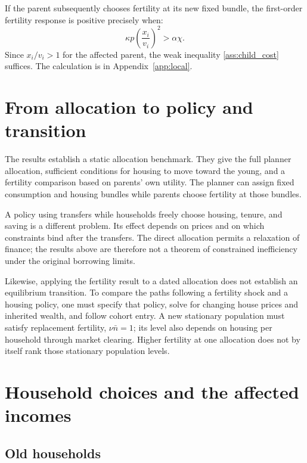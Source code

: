\documentclass[11pt]{article}
\begin{document}
If the parent subsequently chooses fertility at its new fixed bundle, the
first-order fertility response is positive precisely when:
\begin{equation}
\kappa p\left(\frac{x_i}{v_i}\right)^2>\alpha\chi.
\label{eq:local_fertility}
\end{equation}
Since $x_i/v_i>1$ for the affected parent, the weak inequality
\eqref{ass:child_cost} suffices. The calculation is in
Appendix~\ref{app:local}.

\section{From allocation to policy and transition}

The results establish a static allocation benchmark. They give the full
planner allocation, sufficient conditions for housing to move toward the
young, and a fertility comparison based on parents' own utility. The planner
can assign fixed consumption and housing bundles while parents choose fertility
at those bundles.

A policy using transfers while households freely choose housing, tenure, and
saving is a different problem. Its effect depends on prices and on which
constraints bind after the transfers. The direct allocation permits a
relaxation of finance; the results above are therefore not a theorem of
constrained inefficiency under the original borrowing limits.

Likewise, applying the fertility result to a dated allocation does not establish
an equilibrium transition. To compare the paths following a fertility shock
and a housing policy, one must specify that policy, solve for changing house
prices and inherited wealth, and follow cohort entry. A new stationary
population must satisfy replacement fertility, $\nu\bar n=1$; its level also
depends on housing per household through market clearing. Higher fertility at
one allocation does not by itself rank those stationary population levels.

\clearpage
\appendix
\section{Household choices and the affected incomes}\label{app:households}

\subsection{Old households}
\end{document}
